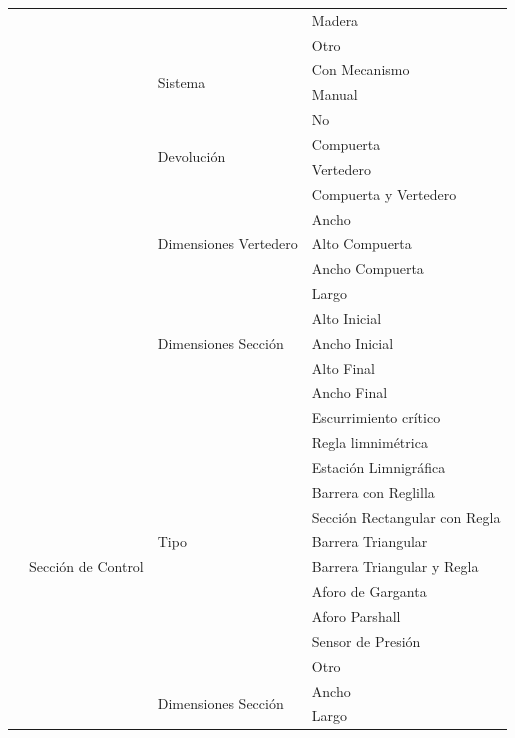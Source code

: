 \documentclass[]{article}
\begin{document}
\begin{longtable}{|p{3cm}|p{3.5cm}|p{3.5cm}|p{3.5cm}|}
    & & & Madera\\    \cline{4-4}
    & & & Otro\\    \cline{3-4}
    & & \multirow {2}{3.5cm}{Sistema} & Con Mecanismo\\    \cline{4-4}
    & & & Manual\\    \cline{3-4}
    & & \multirow {4}{3.5cm}{Devolución} & No\\    \cline{4-4}
    & & & Compuerta\\    \cline{4-4}
    & & & Vertedero\\    \cline{4-4}
    & & & Compuerta y Vertedero\\    \cline{3-4}
    & & \multirow {3}{3.5cm}{Dimensiones Vertedero} & Ancho\\    \cline{4-4}
    & & & Alto Compuerta\\    \cline{4-4}
    & & & Ancho Compuerta\\    \cline{3-4}
    & & \multirow {5}{3.5cm}{Dimensiones Sección} & Largo\\    \cline{4-4}
    & & & Alto Inicial\\    \cline{4-4}
    & & & Ancho Inicial\\    \cline{4-4}
    & & & Alto Final\\    \cline{4-4}
    & & & Ancho Final\\    \cline{2-4} \pagebreak
    \multirow {17}{3cm}{Bocatoma} & \multirow {17}{3.5cm}{Sección de Control} & \multirow {11}{3.5cm}{Tipo} &  Escurrimiento crítico\\    \cline{4-4}
    & & & Regla limnimétrica\\    \cline{4-4}
    & & & Estación Limnigráfica\\    \cline{4-4}
    & & & Barrera con Reglilla\\    \cline{4-4}
    & & & Sección Rectangular con Regla\\    \cline{4-4}
    & & & Barrera Triangular\\    \cline{4-4}
    & & & Barrera Triangular y Regla\\    \cline{4-4}
    & & & Aforo de Garganta\\    \cline{4-4}
    & & & Aforo Parshall\\    \cline{4-4}
    & & & Sensor de Presión\\    \cline{4-4}
    & & & Otro\\    \cline{3-4}
    & & \multirow {3}{3.5cm}{Dimensiones Sección} & Ancho\\    \cline{4-4}
    & & & Largo\\    \cline{4-4}

\end{longtable}
\end{document}
